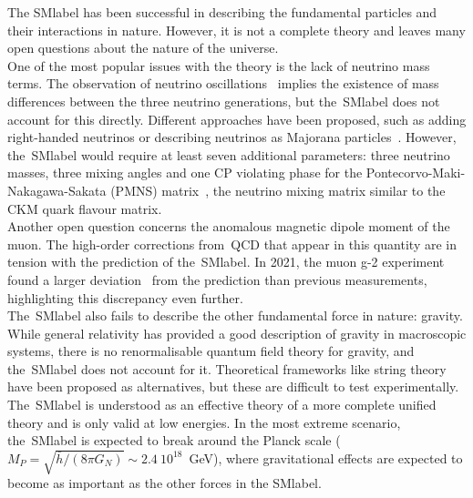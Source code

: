 The \acrshort{SMlabel} has been successful in describing the fundamental particles and their interactions in nature. However, it is not a complete theory and leaves many open questions about the nature of the universe.\\

One of the most popular issues with the theory is the lack of neutrino mass terms. The observation of neutrino oscillations~\cite{neutrinoosc}  implies the existence of mass differences between the three neutrino generations, but the~\acrshort{SMlabel} does not account for this directly. Different approaches have been proposed, such as adding right-handed neutrinos or describing neutrinos as Majorana particles~\cite{Majorana2006}. However, the~\acrshort{SMlabel} would require at least seven additional parameters: three neutrino masses, three mixing angles and one CP violating phase for the Pontecorvo-Maki-Nakagawa-Sakata (PMNS) matrix~\cite{10.1143/PTP.28.870,Pontecorvo:1967fh}, the neutrino mixing matrix similar to the CKM quark flavour matrix.\\

Another open question concerns the anomalous magnetic dipole moment of the muon. The high-order corrections from~\acrshort{QCD} that appear in this quantity are in tension with the prediction of the~\acrshort{SMlabel}. In 2021, the muon g-2 experiment found a larger deviation~\cite{PhysRevLett.126.141801} from the prediction than previous measurements, highlighting this discrepancy even further.\\


The~\acrshort{SMlabel} also fails to describe the other fundamental force in nature: gravity. While general relativity has provided a good description of gravity in macroscopic systems, there is no renormalisable quantum field theory for gravity, and the~\acrshort{SMlabel} does not account for it. Theoretical frameworks like string theory have been proposed as alternatives, but these are difficult to test experimentally. The~\acrshort{SMlabel} is understood as an effective theory of a more complete unified theory and is only valid at low energies. In the most extreme scenario, the~\acrshort{SMlabel} is expected to break around the Planck scale ($M_P=\sqrt{\bar{h}/(8\pi G_N)}\sim 2.4\ 10^{18}$~GeV), where gravitational effects are expected to become as important as the other forces in the \acrshort{SMlabel}.\\

